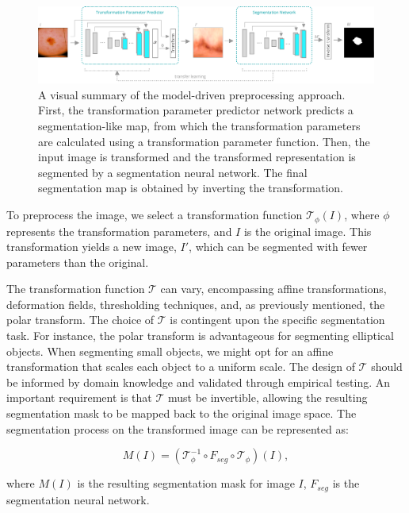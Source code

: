  	\begin{figure}[h]
		\centering
		\includegraphics[width=\linewidth]{images/4/model-based-preprocessing-overview}
		\caption{A visual summary of the model-driven preprocessing approach. First, the transformation parameter predictor network predicts a segmentation-like map, from which the transformation parameters are calculated using a transformation parameter function. Then, the input image is transformed and the transformed representation is segmented by a segmentation neural network. The final segmentation map is obtained by inverting the transformation.}
		\label{fig:visual-summary-mdp}
	\end{figure}

To preprocess the image, we select a transformation function \(\mathcal{T}_{\phi}(I)\), where \(\phi\) represents the transformation parameters, and \(I\) is the original image. This transformation yields a new image, \(I'\), which can be segmented with fewer parameters than the original. 

The transformation function \(\mathcal{T}\) can vary, encompassing affine transformations, deformation fields, thresholding techniques, and, as previously mentioned, the polar transform. The choice of \(\mathcal{T}\) is contingent upon the specific segmentation task. For instance, the polar transform is advantageous for segmenting elliptical objects. When segmenting small objects, we might opt for an affine transformation that scales each object to a uniform scale. The design of \(\mathcal{T}\) should be informed by domain knowledge and validated through empirical testing. An important requirement is that \(\mathcal{T}\) must be invertible, allowing the resulting segmentation mask to be mapped back to the original image space. The segmentation process on the transformed image can be represented as:

\begin{equation}
	M(I) = (\mathcal{T}_{\phi}^{-1} \circ F_{seg} \circ \mathcal{T}_{\phi})(I),
\end{equation}

where $M(I)$ is the resulting segmentation mask for image $I$, $F_{seg}$ is the segmentation neural network. 

